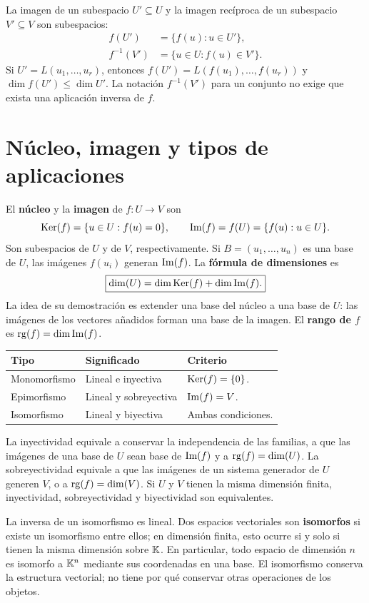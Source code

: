 La imagen de un subespacio $U'\subseteq U$ y la imagen recíproca de un
subespacio $V'\subseteq V$ son subespacios:
\[
 \begin{split}
 f(U')&=\{f(u):u\in U'\},\\
 f^{-1}(V')&=\{u\in U:f(u)\in V'\}.
 \end{split}
\]
Si $U'=L(u_1,\ldots,u_r)$, entonces
$f(U')=L(f(u_1),\ldots,f(u_r))$ y $\dim f(U')\le\dim U'$.
La notación $f^{-1}(V')$ para un conjunto no exige que exista una aplicación
inversa de $f$.

\section{Núcleo, imagen y tipos de aplicaciones}
\label{sec:nucleo-imagen}

El \textbf{núcleo} y la \textbf{imagen} de $f:U\to V$ son
\[
 \operatorname{Ker}(f)=\{u\in U:f(u)=0\},\qquad
 \operatorname{Im}(f)=f(U)=\{f(u):u\in U\}.
\]
Son subespacios de $U$ y de $V$, respectivamente. Si $B=(u_1,\ldots,u_n)$
es una base de $U$, las imágenes $f(u_i)$ generan $\operatorname{Im}(f)$.
La \textbf{fórmula de dimensiones} es
\[
 \boxed{\dim(U)=\dim\operatorname{Ker}(f)+\dim\operatorname{Im}(f).}
\]
La idea de su demostración es extender una base del núcleo a una base
de $U$: las imágenes de los vectores añadidos forman una base de la imagen.
El \textbf{rango de $f$} es $\operatorname{rg}(f)=\dim\operatorname{Im}(f)$.

\begin{center}
\begin{tabular}{@{}lll@{}}
\toprule
Tipo & Significado & Criterio \\
\midrule
Monomorfismo & Lineal e inyectiva & $\operatorname{Ker}(f)=\{0\}$. \\
Epimorfismo & Lineal y sobreyectiva & $\operatorname{Im}(f)=V$. \\
Isomorfismo & Lineal y biyectiva & Ambas condiciones. \\
\bottomrule
\end{tabular}
\end{center}
La inyectividad equivale a conservar la independencia de las familias,
a que las imágenes de una base de $U$ sean base de $\operatorname{Im}(f)$ y a
$\operatorname{rg}(f)=\dim(U)$. La sobreyectividad equivale a que las imágenes
de un sistema generador de $U$ generen $V$, o a $\operatorname{rg}(f)=\dim(V)$.
Si $U$ y $V$ tienen la misma dimensión finita, inyectividad,
sobreyectividad y biyectividad son equivalentes.

La inversa de un isomorfismo es lineal. Dos espacios vectoriales son
\textbf{isomorfos} si existe un isomorfismo entre ellos; en dimensión finita,
esto ocurre si y solo si tienen la misma dimensión sobre $\mathbb{K}$.
En particular, todo espacio de dimensión $n$ es isomorfo a $\mathbb{K}^n$ mediante
sus coordenadas en una base. El isomorfismo conserva la estructura
vectorial; no tiene por qué conservar otras operaciones de los objetos.

